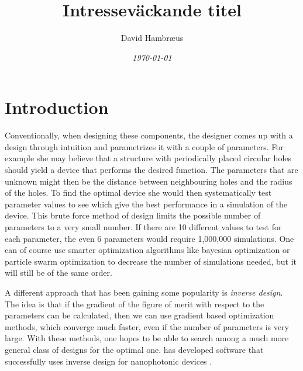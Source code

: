 \documentclass[11pt]{article}
\title{Intresseväckande titel}
\author{David Hambr\ae us}
\date{\textit{\today}}
\begin{document}
\maketitle

\listoftodos

\tableofcontents

\printglossaries{}

\section{Introduction}


Conventionally, when designing these components, the designer comes up with a
design through intuition and parametrizes it with a couple of parameters.
For example she may believe that a structure with periodically placed circular
holes should yield a device that performs the desired function.
The parameters that are unknown might then be the distance between neighbouring
holes and the radius of the holes.
To find the optimal device she would then systematically test parameter values
to see which give the best performance in a simulation of the device.
This brute force method of design limits the possible number of parameters to a
very small number.
If there are 10 different values to test for each parameter, the even 6
parameters would require 1,000,000 simulations.
One can of course use smarter optimization algorithms like bayesian optimization
or particle swarm optimization
to decrease the number of simulations needed, but it will still be of the same
order.

A different approach that has been gaining some popularity is
\emph{inverse design}.
The idea is that if the gradient of the figure of merit
with respect to the parameters can be calculated, then we can use gradient based
optimization methods, which converge much faster, even if the number of
parameters is very large. With these methods, one hopes to be able to search
among a much more general class of designs for the optimal one.
\citeauthor{spins2019} has developed software that successfully uses inverse design for
nanophotonic devices \cite{spins2019}.
\end{document}
